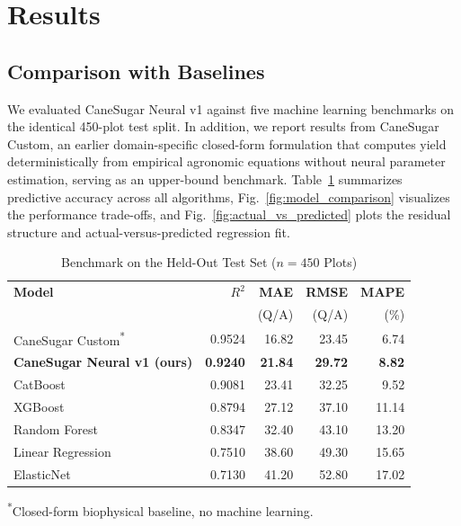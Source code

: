 \documentclass[conference,10pt,letterpaper]{IEEEtran}
\begin{document}
\section{Results}

\subsection{Comparison with Baselines}
We evaluated CaneSugar Neural v1 against five machine learning benchmarks on the identical 450-plot test split. In addition, we report results from CaneSugar Custom, an earlier domain-specific closed-form formulation that computes yield deterministically from empirical agronomic equations without neural parameter estimation, serving as an upper-bound benchmark. Table~\ref{tab:main_results} summarizes predictive accuracy across all algorithms, Fig.~\ref{fig:model_comparison} visualizes the performance trade-offs, and Fig.~\ref{fig:actual_vs_predicted} plots the residual structure and actual-versus-predicted regression fit.

\begin{table}[htbp]
\caption{Benchmark on the Held-Out Test Set ($n=450$ Plots)}
\label{tab:main_results}
\centering
\footnotesize
\setlength{\tabcolsep}{3pt}
\begin{tabular*}{\columnwidth}{@{\extracolsep{\fill}}lrrrr@{}}
\toprule
\textbf{Model} & \textbf{$R^2$} & \textbf{MAE} & \textbf{RMSE} & \textbf{MAPE} \\
 & & \scriptsize(Q/A) & \scriptsize(Q/A) & \scriptsize(\%) \\
\midrule
CaneSugar Custom\textsuperscript{*}   & 0.9524 & 16.82 & 23.45 & 6.74 \\
\textbf{CaneSugar Neural v1 (ours)}   & \textbf{0.9240} & \textbf{21.84} & \textbf{29.72} & \textbf{8.82} \\
CatBoost                              & 0.9081 & 23.41 & 32.25 & 9.52 \\
XGBoost                               & 0.8794 & 27.12 & 37.10 & 11.14 \\
Random Forest                         & 0.8347 & 32.40 & 43.10 & 13.20 \\
Linear Regression                     & 0.7510 & 38.60 & 49.30 & 15.65 \\
ElasticNet                            & 0.7130 & 41.20 & 52.80 & 17.02 \\
\bottomrule
\end{tabular*}
\vspace{2pt}

{\scriptsize \textsuperscript{*}Closed-form biophysical baseline, no machine learning.}
\end{table}
\end{document}
